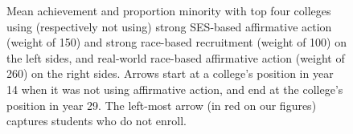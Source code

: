 \begin{figure}[p]
  \centering
  \hfill%
  \caption{Mean achievement and proportion minority with top four colleges using (respectively not using) strong SES-based affirmative action (weight of 150) and strong race-based recruitment (weight of 100) on the left sides, and real-world race-based affirmative action (weight of 260) on the right sides.  
  Arrows start at a college's position in year 14 when it was not using affirmative action, and end at the college's position in year 29.
  The left-most arrow (in red on our figures) captures students who do not enroll.}
  \label{fig:3a}
\end{figure}


